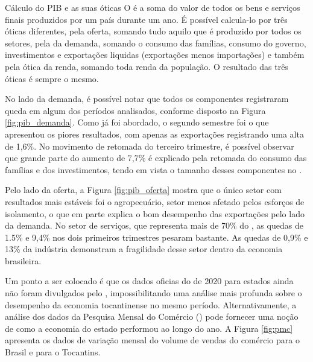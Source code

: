 \begin{smbox}[label={labelbox},nameref={Cálculo do PIB e as suas óticas}]{Cálculo do PIB e as suas óticas}
	O  é a soma do valor de todos os bens e serviços finais produzidos por um país durante um ano. É possível calcula-lo por três óticas diferentes, pela oferta, somando tudo aquilo que é produzido por todos os setores, pela da demanda, somando o consumo das famílias, consumo do governo, investimentos e exportações liquidas (exportações menos importações) e também pela ótica da renda, somando toda renda da população. O resultado das três óticas é sempre o mesmo.
\end{smbox}
\par No lado da demanda, é possível notar que todos os componentes registraram queda em algum dos períodos analisados, conforme disposto na Figura \ref{fig:pib_demanda}. Como já foi abordado, o segundo semestre foi o que apresentou os piores resultados, com apenas as exportações registrando uma alta de 1,6\%. No movimento de retomada do terceiro trimestre, é possível observar que grande parte do aumento de 7,7\% é explicado pela retomada do consumo das famílias e dos investimentos, tendo em vista o tamanho desses componentes no .
\par Pelo lado da oferta, a Figura \ref{fig:pib_oferta} mostra que o único setor com resultados mais estáveis foi o agropecuário, setor menos afetado pelos esforços de isolamento, o que em parte explica o bom desempenho das exportações pelo lado da demanda. No setor de serviços, que representa mais de 70\% do , as quedas de 1.5\% e 9,4\% nos dois primeiros trimestres pesaram bastante. As quedas de 0,9\% e 13\% da indústria demonstram a fragilidade desse setor dentro da economia brasileira.
\par Um ponto a ser colocado é que os dados oficias do  de 2020 para estados ainda não foram divulgados pelo , impossibilitando uma análise mais profunda sobre o desempenho da economia tocantinense no mesmo período. Alternativamente, a análise dos dados da Pesquisa Mensal do Comércio () pode fornecer uma noção de como a economia do estado performou ao longo do ano. A Figura \ref{fig:pmc} apresenta os dados de variação mensal do volume de vendas do comércio para o Brasil e para o Tocantins.

